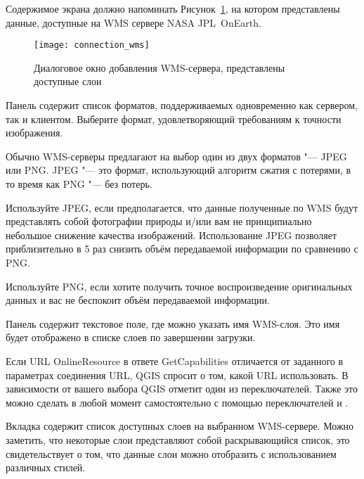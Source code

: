 Содержимое экрана должно напоминать Рисунок~\ref{fig:connection_wms}, на
котором представлены данные, доступные на WMS сервере NASA JPL~OnEarth.

\begin{figure}[ht]
  \centering
  \texttt{[image: connection\_wms]}
  \caption{Диалоговое окно добавления WMS-сервера, представлены доступные слои
  \wincaption}\label{fig:connection_wms}
\end{figure}


Панель  содержит список форматов,
поддерживаемых одновременно как сервером, так и клиентом.
Выберите формат, удовлетворяющий требованиям к точности изображения.

\begin{Tip}[ht]\caption{\textsc{Формат изображения}}
Обычно WMS-серверы предлагают на выбор один из двух форматов "--- JPEG или PNG.
JPEG "--- это формат, использующий алгоритм сжатия с потерями, в то время
как PNG "--- без потерь.

Используйте JPEG, если предполагается, что данные полученные по WMS
будут представлять собой фотографии природы и/или вам не принципиально
небольшое снижение качества изображений. Использование JPEG позволяет
приблизительно в 5 раз снизить объём передаваемой информации по сравнению
с PNG.

Используйте PNG, если хотите получить точное воспроизведение оригинальных
данных и вас не беспокоит объём передаваемой информации. 
\end{Tip}


Панель содержит текстовое поле, где можно указать имя
WMS-слоя. Это имя будет отображено в списке слоев по завершении загрузки.

Если URL OnlineResource в ответе GetCapabilities отличается от заданного в
параметрах соединения URL, QGIS спросит о том, какой URL использовать.
В зависимости от вашего выбора QGIS отметит один из переключателей. Также это
можно сделать в любой момент самостоятельно с помощью переключателей
 и .

 \label{ogc-wms-layers}

Вкладка  содержит список доступных слоев на выбранном WMS-сервере.
Можно заметить, что некоторые слои представляют собой раскрывающийся список,
это свидетельствует о том, что данные слои можно отобразить с использованием
различных стилей.

